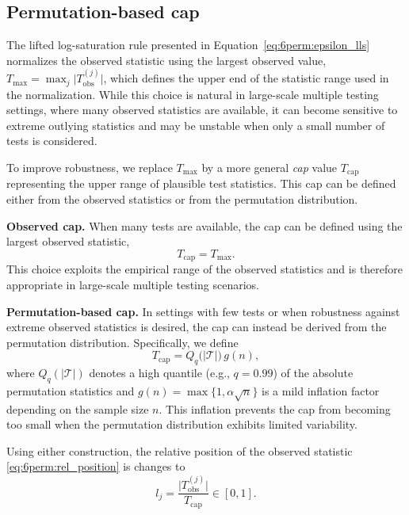 \subsection{Permutation-based cap}
\label{sec:6perm:epsilon:cap}

The lifted log-saturation rule presented in Equation~\eqref{eq:6perm:epsilon_lls} normalizes the observed statistic using the largest observed value,
$T_{\max} = \max_j \big|T_{\mathrm{obs}}^{(j)}\big|$,
which defines the upper end of the statistic range used in the normalization. 
While this choice is natural in large-scale multiple testing settings, where many observed statistics are available, it can become sensitive to extreme outlying statistics and may be unstable when only a small number of tests is considered.

To improve robustness, we replace $T_{\max}$ by a more general \emph{cap} value $T_{\mathrm{cap}}$ representing the upper range of plausible test statistics. 
This cap can be defined either from the observed statistics or from the permutation distribution.

\noindent\textbf{Observed cap.}
When many tests are available, the cap can be defined using the largest observed statistic,
\begin{equation}
    T_{\mathrm{cap}} = T_{\max}.
\end{equation}
This choice exploits the empirical range of the observed statistics and is therefore appropriate in large-scale multiple testing scenarios.

\noindent\textbf{Permutation-based cap.}
In settings with few tests or when robustness against extreme observed statistics is desired, the cap can instead be derived from the permutation distribution. 
Specifically, we define
\begin{equation}
T_{\mathrm{cap}} = Q_q\!\big(|\mathcal{T}|\big)\, g(n),
\end{equation}
where $Q_q(|\mathcal{T}|)$ denotes a high quantile (e.g., $q=0.99$) of the absolute permutation statistics and $g(n) = \max\{1,\alpha\sqrt{n}\}$ is a mild inflation factor depending on the sample size $n$. This inflation prevents the cap from becoming too small when the permutation distribution exhibits limited variability.

Using either construction, the relative position of the observed statistic \eqref{eq:6perm:rel_position} is changes to
\begin{equation}
\label{eq:6perm:rel_position_cap}
l_j = \frac{\big|T_{\mathrm{obs}}^{(j)}\big|}{T_{\mathrm{cap}}} \in [0,1].
\end{equation}

